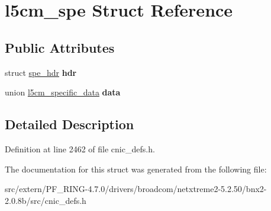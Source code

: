 \hypertarget{structl5cm__spe}{
\section{l5cm\_\-spe Struct Reference}
\label{structl5cm__spe}
}
\subsection*{Public Attributes}
\begin{DoxyCompactItemize}
\item 
\hypertarget{structl5cm__spe_a79523bc3ca052273d6eacf81f480b819}{
struct \hyperlink{structspe__hdr}{spe\_\-hdr} {\bfseries hdr}}
\label{structl5cm__spe_a79523bc3ca052273d6eacf81f480b819}

\item 
\hypertarget{structl5cm__spe_a84db5fc2d282094a813ecc1db76c926b}{
union \hyperlink{unionl5cm__specific__data}{l5cm\_\-specific\_\-data} {\bfseries data}}
\label{structl5cm__spe_a84db5fc2d282094a813ecc1db76c926b}

\end{DoxyCompactItemize}


\subsection{Detailed Description}


Definition at line 2462 of file cnic\_\-defs.h.



The documentation for this struct was generated from the following file:\begin{DoxyCompactItemize}
\item 
src/extern/PF\_\-RING-\/4.7.0/drivers/broadcom/netxtreme2-\/5.2.50/bnx2-\/2.0.8b/src/cnic\_\-defs.h\end{DoxyCompactItemize}
